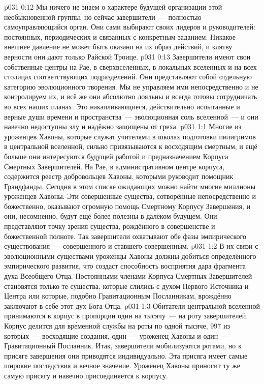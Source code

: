 \vs p031 0:12 Мы ничего не знаем о характере будущей организации этой необыкновенной группы, но сейчас завершители~--- полностью самоуправляющийся орган. Они сами выбирают своих лидеров и руководителей: постоянных, периодических и связанных с конкретным заданием. Никакое внешнее давление не может быть оказано на их образ действий, и клятву верности они дают только Райской Троице.
\vs p031 0:13 Завершители имеют свои собственные центры на Рае, в сверхвселенных, в локальных вселенных и на всех столицах соответствующих подразделений. Они представляют собой отдельную категорию эволюционного творения. Мы не управляем ими непосредственно и не контролируем их, и всё же они абсолютно лояльны и всегда готовы сотрудничать во всех наших планах. Это накапливающиеся, действительно испытанные и верные души времени и пространства~--- эволюционная соль вселенной~--- и они навечно недоступны злу и надёжно защищены от греха.
\vs p031 1:1 Многие из уроженцев Хавоны, которые служат учителями в школах подготовки пилигримов в центральной вселенной, сильно привязываются к восходящим смертным, и ещё больше они интересуются будущей работой и предназначением Корпуса Смертных Завершителей. На Рае, в административном центре корпуса, содержится реестр добровольцев Хавоны, которыми руководит помощник Грандфанды. Сегодня в этом списке ожидающих можно найти многие миллионы уроженцев Хавоны. Эти совершенные существа, сотворённые непосредственно и божественно, оказывают огромную помощь Смертному Корпусу Завершения, и они, несомненно, будут ещё более полезны в далёком будущем. Они представляют точку зрения существа, рождённого в совершенстве и божественной полноте. Так завершители охватывают обе фазы эмпирического существования~--- совершенного и ставшего совершенным.
\vs p031 1:2 В их связи с эволюционными существами уроженцы Хавоны должны добиться определённого эмпирического развития, что создаст способность восприятия дара фрагмента духа Всеобщего Отца. Постоянными членами Корпуса Смертных Завершителей становятся только те существа, которые слились с духом Первого Источника и Центра или которые, подобно Гравитационным Посланникам, врождённо заключают в себе этот дух Бога Отца.
\vs p031 1:3 Обитатели центральной вселенной принимаются в корпус в пропорции один на тысячу~--- на роту завершителей. Корпус делится для вр\'еменной службы на роты по одной тысяче, 997 из которых~--- восходящие создания, один~--- уроженец Хавоны и один~--- Гравитационный Посланник. Итак, завершители мобилизуются ротами, но к присяге завершения они приводятся индивидуально. Эта присяга имеет самые широкие последствия и вечное значение. Уроженец Хавоны приносит ту же самую присягу и навечно присоединяется к корпусу.
